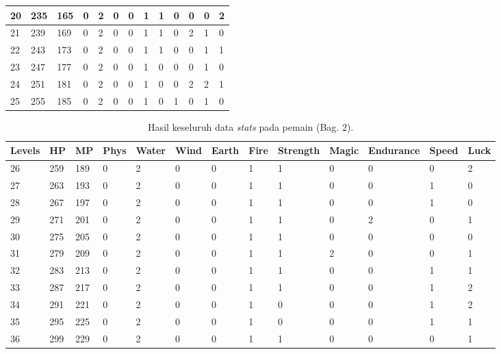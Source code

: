 \begin{sidewaystable}[!h]
\begin{tabular}{|l|l|l|l|l|l|l|l|l|l|l|l|l|}
		20 & 235 & 165 & 0 & 2 & 0 & 0 & 1 & 1 & 0 & 0 & 0 & 2 \\ \hline
		21 & 239 & 169 & 0 & 2 & 0 & 0 & 1 & 1 & 0 & 2 & 1 & 0 \\ \hline
		22 & 243 & 173 & 0 & 2 & 0 & 0 & 1 & 1 & 0 & 0 & 1 & 1 \\ \hline
		23 & 247 & 177 & 0 & 2 & 0 & 0 & 1 & 0 & 0 & 0 & 1 & 0 \\ \hline
		24 & 251 & 181 & 0 & 2 & 0 & 0 & 1 & 0 & 0 & 2 & 2 & 1 \\ \hline
		25 & 255 & 185 & 0 & 2 & 0 & 0 & 1 & 0 & 1 & 0 & 1 & 0 \\ \hline	
	\end{tabular}
\end{sidewaystable}
\clearpage


\begin{sidewaystable}[!h]
	\centering
	\caption{Hasil keseluruh data \textit{stats} pada pemain (Bag. 2).}
	\label{tb:player_all_stats_2}
	\vspace{1ex}
		\begin{tabular}{|l|l|l|l|l|l|l|l|l|l|l|l|l|}
			\hline
			\rowcolor[HTML]{C0C0C0} 
			\textbf{Levels} & \textbf{HP} & \textbf{MP} & \textbf{Phys} & \textbf{Water} & \textbf{Wind} & \textbf{Earth} & \textbf{Fire} & \textbf{Strength} & \textbf{Magic} & \textbf{Endurance} & \textbf{Speed} & \textbf{Luck} \\ \hline
			26 & 259 & 189 & 0 & 2 & 0 & 0 & 1 & 1 & 0 & 0 & 0 & 2 \\ \hline
			27 & 263 & 193 & 0 & 2 & 0 & 0 & 1 & 1 & 0 & 0 & 1 & 0 \\ \hline
			28 & 267 & 197 & 0 & 2 & 0 & 0 & 1 & 1 & 0 & 0 & 1 & 0 \\ \hline
			29 & 271 & 201 & 0 & 2 & 0 & 0 & 1 & 1 & 0 & 2 & 0 & 1 \\ \hline
			30 & 275 & 205 & 0 & 2 & 0 & 0 & 1 & 1 & 0 & 0 & 0 & 0 \\ \hline
			31 & 279 & 209 & 0 & 2 & 0 & 0 & 1 & 1 & 2 & 0 & 0 & 1 \\ \hline
			32 & 283 & 213 & 0 & 2 & 0 & 0 & 1 & 1 & 0 & 0 & 1 & 1 \\ \hline
			33 & 287 & 217 & 0 & 2 & 0 & 0 & 1 & 1 & 0 & 0 & 1 & 2 \\ \hline
			34 & 291 & 221 & 0 & 2 & 0 & 0 & 1 & 0 & 0 & 0 & 1 & 2 \\ \hline
			35 & 295 & 225 & 0 & 2 & 0 & 0 & 1 & 0 & 0 & 0 & 1 & 1 \\ \hline
			36 & 299 & 229 & 0 & 2 & 0 & 0 & 1 & 1 & 0 & 0 & 0 & 1 \\ \hline

\end{tabular}
\end{sidewaystable}
